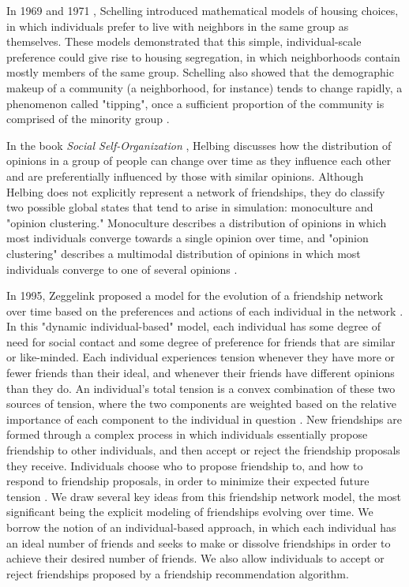 \documentclass[12pt,letterpaper]{article}
\begin{document}
In 1969 \cite{schelling} and 1971 \cite{schellingdynamic}, Schelling introduced mathematical models of housing choices, in which individuals prefer to live with neighbors in the same group as themselves. These models demonstrated that this simple, individual-scale preference could give rise to housing segregation, in which neighborhoods contain mostly members of the same group. Schelling also showed that the demographic makeup of a community (a neighborhood, for instance) tends to change rapidly, a phenomenon called "tipping", once a sufficient proportion of the community is comprised of the minority group \cite{schellingdynamic}.

In the book \textit{Social Self-Organization} \cite{helbing}, Helbing discusses how the distribution of opinions in a group of people can change over time as they influence each other and are preferentially influenced by those with similar opinions. Although Helbing does not explicitly represent a network of friendships, they do classify two possible global states that tend to arise in simulation: monoculture and "opinion clustering." Monoculture describes a distribution of opinions in which most individuals converge towards a single opinion over time, and "opinion clustering" describes a multimodal distribution of opinions in which most individuals converge to one of several opinions \cite{helbing}. 

In 1995, Zeggelink proposed a model for the evolution of a friendship network over time based on the preferences and actions of each individual in the network \cite{zeggelink}. In this "dynamic individual-based" model, each individual has some degree of need for social contact and some degree of preference for friends that are similar or like-minded. Each individual experiences tension whenever they have more or fewer friends than their ideal, and whenever their friends have different opinions than they do. An individual's total tension is a convex combination of these two sources of tension, where the two components are weighted based on the relative importance of each component to the individual in question \cite{zeggelink}. New friendships are formed through a complex process in which individuals essentially propose friendship to other individuals, and then accept or reject the friendship proposals they receive. Individuals choose who to propose friendship to, and how to respond to friendship proposals, in order to minimize their expected future tension \cite {zeggelink}. We draw several key ideas from this friendship network model, the most significant being the explicit modeling of friendships evolving over time. We borrow the notion of an individual-based approach, in which each individual has an ideal number of friends and seeks to make or dissolve friendships in order to achieve their desired number of friends. We also allow individuals to accept or reject friendships proposed by a friendship recommendation algorithm. 
\end{document}

